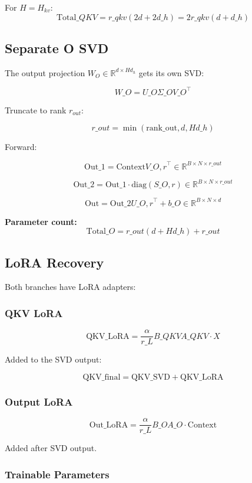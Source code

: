 For $H = H_{kv}$:
\[
\text{Total}\_{QKV} = r\_{qkv} (2d + 2 d\_h) = 2 r\_{qkv} (d + d\_h)
\]

\subsection{Separate O SVD}

The output projection $W_O \in \mathbb{R}^{d \times H d_h}$ gets its own SVD:

\[
W\_O = U\_O \Sigma\_O V\_O^\top
\]

Truncate to rank $r_{out}$:

\[
r\_{out} = \min(\text{rank\_out}, d, H d\_h)
\]

Forward:

\[
\text{Out}\_1 = \text{Context} V\_{O, r}^\top \in \mathbb{R}^{B \times N \times r\_{out}}
\]

\[
\text{Out}\_2 = \text{Out}\_1 \cdot \text{diag}(S\_{O, r}) \in \mathbb{R}^{B \times N \times r\_{out}}
\]

\[
\text{Out} = \text{Out}\_2 U\_{O, r}^\top + b\_O \in \mathbb{R}^{B \times N \times d}
\]

\textbf{Parameter count:}
\[
\text{Total}\_O = r\_{out} (d + H d\_h) + r\_{out}
\]

\subsection{LoRA Recovery}

Both branches have LoRA adapters:

\subsubsection{QKV LoRA}

\[
\text{QKV}\_\text{LoRA} = \frac{\alpha}{r\_L} B\_{QKV} A\_{QKV} \cdot X
\]

Added to the SVD output:

\[
\text{QKV}\_\text{final} = \text{QKV}\_\text{SVD} + \text{QKV}\_\text{LoRA}
\]

\subsubsection{Output LoRA}

\[
\text{Out}\_\text{LoRA} = \frac{\alpha}{r\_L} B\_O A\_O \cdot \text{Context}
\]

Added after SVD output.

\subsubsection{Trainable Parameters}

